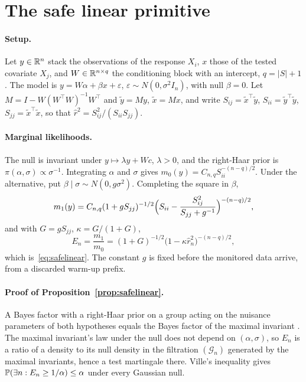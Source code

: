 
\section{The safe linear primitive}\label{app:safelinear}

\paragraph{Setup.} Let $y\in\mathbb{R}^n$ stack the observations of the response
$X_i$, $x$ those of the tested covariate $X_j$, and $W\in\mathbb{R}^{n\times q}$ the
conditioning block with an intercept, $q=|S|+1$. The model is
$y=W\alpha+\beta x+\varepsilon$, $\varepsilon\sim N(0,\sigma^2I_n)$, with null
$\beta=0$. Let $M=I-W(W^\top W)^{-1}W^\top$ and $\tilde y=My$, $\tilde x=Mx$,
and write $S_{ij}=\tilde x^\top\tilde y$, $S_{ii}=\tilde y^\top\tilde y$,
$S_{jj}=\tilde x^\top\tilde x$, so that $\hat r^2=S_{ij}^2/(S_{ii}S_{jj})$.

\paragraph{Marginal likelihoods.} The null is invariant under
$y\mapsto\lambda y+Wc$, $\lambda>0$, and the right-Haar prior is
$\pi(\alpha,\sigma)\propto\sigma^{-1}$. Integrating $\alpha$ and $\sigma$ gives
$m_0(y)=C_{n,q}S_{ii}^{-(n-q)/2}$. Under the alternative, put
$\beta\mid\sigma\sim N(0,g\sigma^2)$. Completing the square in $\beta$,
\[
m_1(y)=C_{n,q}(1+gS_{jj})^{-1/2}\Bigl(S_{ii}-\frac{S_{ij}^2}{S_{jj}+g^{-1}}\Bigr)^{-(n-q)/2},
\]
and with $G=gS_{jj}$, $\kappa=G/(1+G)$,
\[
E_n=\frac{m_1}{m_0}=(1+G)^{-1/2}\bigl(1-\kappa\hat r_n^2\bigr)^{-(n-q)/2},
\]
which is~\eqref{eq:safelinear}. The constant $g$ is fixed before the monitored
data arrive, from a discarded warm-up prefix.

\paragraph{Proof of Proposition~\ref{prop:safelinear}.} A Bayes factor with a
right-Haar prior on a group acting on the nuisance parameters of both
hypotheses equals the Bayes factor of the maximal invariant
\citep{berger1998bayes,hendriksen2021optional}. The maximal invariant's law
under the null does not depend on $(\alpha,\sigma)$, so $E_n$ is a ratio of a
density to its null density in the filtration $(\mathcal G_n)$ generated by the
maximal invariants, hence a test martingale there. Ville's inequality gives
$\mathbb{P}(\exists n:E_n\ge1/\alpha)\le\alpha$ under every Gaussian null.

